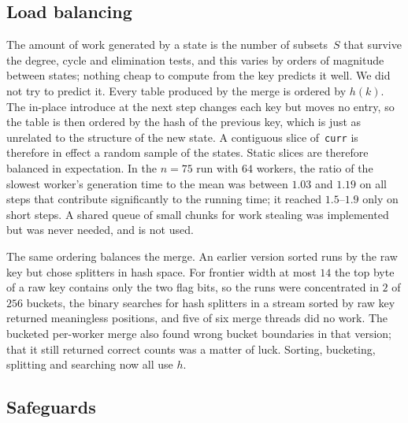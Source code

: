 \documentclass[12pt]{article}
\theoremstyle{definition}
\newcommand{\curr}{\texttt{curr}}
\begin{document}
\subsection{Load balancing}

The amount of work generated by a state is the number of subsets~$S$ that
survive the degree, cycle and elimination tests, and this varies by orders of
magnitude between states; nothing cheap to compute from the key predicts it
well.
We did not try to predict it.
Every table produced by the merge is ordered by $h(k)$.
The in-place introduce at the next step changes each key but moves no entry,
so the table is then ordered by the hash of the previous key, which is just
as unrelated to the structure of the new state.
A contiguous slice of~\curr{} is therefore in effect a random sample of the
states.
Static slices are therefore balanced in expectation.
In the $n=75$ run with $64$ workers, the ratio of the slowest worker's
generation time to the mean was between $1.03$ and $1.19$ on all steps that
contribute significantly to the running time; it reached $1.5$--$1.9$ only
on short steps.
A shared queue of small chunks for work stealing was implemented but was
never needed, and is not used.

The same ordering balances the merge.
An earlier version sorted runs by the raw key but chose splitters in hash
space.
For frontier width at most $14$ the top byte of a raw key contains only the
two flag bits, so the runs were
concentrated in $2$ of $256$ buckets, the binary searches for hash
splitters in a stream sorted by raw key returned meaningless positions, and
five of six merge threads did no work.
The bucketed per-worker merge also found wrong bucket boundaries in that
version; that it still returned correct counts was a matter of luck.
Sorting, bucketing, splitting and searching now all use $h$.

\subsection{Safeguards}
\end{document}
